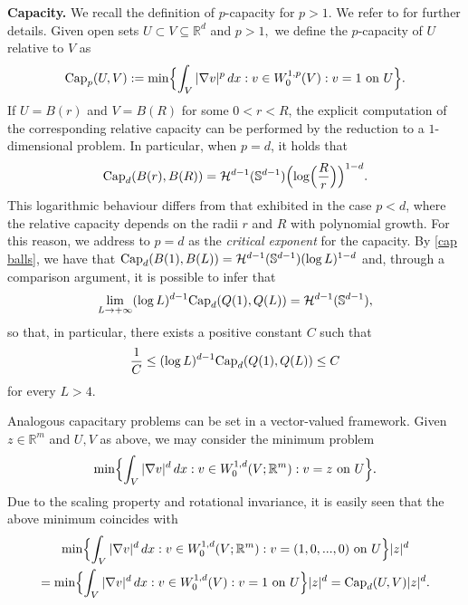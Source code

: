 \documentclass{article}
\theoremstyle{plain}
\theoremstyle{definition}
\def\rr{{\mathbb R}}
\numberwithin{equation}{section}
\begin{document}
{\bf Capacity.} We recall the definition of $p$-capacity for $p>1$. We refer to \cite{HKM} for further details. Given open sets $U\subset V \subseteq \rr^d$ and $p> 1,$ we define the $p$-capacity of $U$ relative to $V$ as
\begin{equation*}
    {\rm Cap}_p(U,V):=\min\Bigl\{\int_V |\nabla v|^p\, dx : v\in W^{1,p}_0(V): v= 1 \text{ on } U\Bigr\}.
\end{equation*}
If $U=B(r)$ and $V=B(R)$ for some $0<r<R$, the explicit computation of the corresponding relative capacity can be performed by the reduction to a $1$-dimensional problem. In particular, when $p=d$, it holds that
\begin{equation}\label{cap balls}
    {\rm Cap}_d(B(r),B(R))= \mathcal{H}^{d-1}(\mathbb{S}^{d-1})\Bigl(\log \Bigl(\frac{R}{r}\Bigr)\Bigr)^{1-d}. 
\end{equation}
This logarithmic behaviour differs from that exhibited in the case $p<d$, where the relative capacity depends on the radii $r$ and $R$ with polynomial growth. For this reason, we address to $p=d$ as the {\it critical exponent} for the capacity. By \eqref{cap balls}, we have that ${\rm Cap}_d(B(1),B(L))=\mathcal{H}^{d-1}(\mathbb{S}^{d-1})(\log L)^{1-d}$ and, through a comparison argument, it is possible to infer that 
\begin{equation*}
    \lim_{L\to+\infty}(\log L)^{d-1} {\rm Cap}_d(Q(1),Q(L))= \mathcal{H}^{d-1}(\mathbb{S}^{d-1}),
\end{equation*}
so that, in particular, there exists a positive constant $C$ such that
\begin{equation}\label{stima uniforme capacita}
    \frac{1}{C}\leq (\log L)^{d-1} {\rm Cap}_d(Q(1),Q(L)) \leq C
\end{equation}
for every $L>4$.

Analogous capacitary problems can be set in a vector-valued framework. Given $z\in\rr^m$ and $U,V$ as above, we may consider the minimum problem
\begin{equation*}
    \min\Bigl\{\int_V |\nabla v|^d\, dx : v\in W^{1,d}_0(V; \rr^m): v= z \text{ on } U\Bigr\}.
\end{equation*}
Due to the scaling property and rotational invariance, it is easily seen that the above minimum coincides with
\begin{multline*}
     \min\Bigl\{\int_V |\nabla v|^d\, dx : v\in W^{1,d}_0(V; \rr^m): v= (1,0,...,0) \text{ on } U\Bigr\}|z|^d \\
     = \min\Bigl\{\int_V |\nabla v|^d\, dx : v\in W^{1,d}_0(V): v= 1\text{ on } U\Bigr\}|z|^d=  {\rm Cap}_d(U,V)|z|^d.
\end{multline*}
\end{document}

